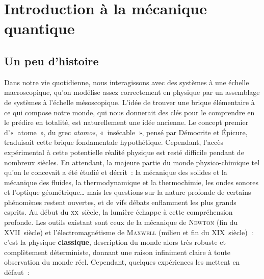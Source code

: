 \documentclass[../main/main.tex]{subfiles}
\begin{document}
\setcounter{chapter}{-1}
\chapter{Introduction \`a la m\'ecanique quantique}
\label{ch:mecaq}

\section{Un peu d'histoire}
\label{sec:mqhistoire}
Dans notre vie quotidienne, nous interagissons avec des systèmes à une échelle
macroscopique, qu'on modélise assez correctement en physique par un assemblage
de systèmes à l'échelle mésoscopique. L'idée de trouver une brique élémentaire à
ce qui compose notre monde, qui nous donnerait des clés pour le comprendre en le
prédire en totalité, est naturellement une idée ancienne. Le concept premier
d'«~atome~», du grec \textit{atomos}, «~insécable~», pensé par Démocrite et
Épicure, traduisait cette brique fondamentale hypothétique. Cependant, l'accès
expérimental à cette potentielle réalité physique est resté difficile pendant
de nombreux siècles.
\bigbreak
En attendant, la majeure partie du monde physico-chimique tel qu'on le concevait
a été étudié et décrit~: la mécanique des solides et la mécanique des fluides,
la thermodynamique et la thermochimie, les ondes sonores et l'optique
géométrique… mais les questions sur la nature profonde de certains phénomènes
restent ouvertes, et de vifs débats enflamment les plus grands esprits.
\bigbreak
Au début du \textsc{xx}\ieme\ siècle, la lumière échappe à cette compréhension
profonde. Les outils existant sont ceux de la mécanique de \textsc{Newton} (fin
du \textsc{XVII}\ieme\ siècle) et l'électromagnétisme de \textsc{Maxwell}
(milieu et fin du \textsc{XIX}\ieme\ siècle)~: c'est la physique
\textbf{classique}, description du monde alors très robuste et complètement
déterministe, donnant une raison infiniment claire à toute observation du monde
réel. Cependant, quelques expériences les mettent en défaut~:
\end{document}

